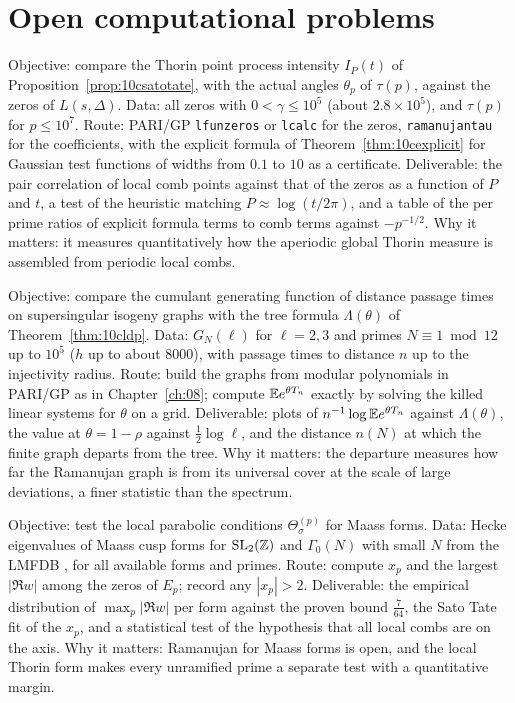 \section{Open computational problems}

\begin{compproblem}
Objective: compare the Thorin point process intensity $I_P(t)$ of Proposition~\ref{prop:10csatotate}, with the actual angles $\theta_p$ of $\tau(p)$, against the zeros of $L(s,\Delta)$. Data: all zeros with $0<\gamma\le10^5$ (about $2.8\times10^5$), and $\tau(p)$ for $p\le10^7$. Route: PARI/GP \texttt{lfunzeros} or \texttt{lcalc} for the zeros, \texttt{ramanujantau} for the coefficients, with the explicit formula of Theorem~\ref{thm:10cexplicit} for Gaussian test functions of widths from $0.1$ to $10$ as a certificate. Deliverable: the pair correlation of local comb points against that of the zeros as a function of $P$ and $t$, a test of the heuristic matching $P\approx\log(t/2\pi)$, and a table of the per prime ratios of explicit formula terms to comb terms against $-p^{-1/2}$. Why it matters: it measures quantitatively how the aperiodic global Thorin measure is assembled from periodic local combs.
\end{compproblem}

\begin{compproblem}
Objective: compare the cumulant generating function of distance passage times on supersingular isogeny graphs with the tree formula $\Lambda(\theta)$ of Theorem~\ref{thm:10cldp}. Data: $G_N(\ell)$ for $\ell=2,3$ and primes $N\equiv1\bmod12$ up to $10^5$ ($h$ up to about $8000$), with passage times to distance $n$ up to the injectivity radius. Route: build the graphs from modular polynomials in PARI/GP as in Chapter~\ref{ch:08}; compute $\mathbb{E} e^{\theta T_n}$ exactly by solving the killed linear systems for $\theta$ on a grid. Deliverable: plots of $n^{-1}\log\mathbb{E} e^{\theta T_n}$ against $\Lambda(\theta)$, the value at $\theta=1-\rho$ against $\frac12\log\ell$, and the distance $n(N)$ at which the finite graph departs from the tree. Why it matters: the departure measures how far the Ramanujan graph is from its universal cover at the scale of large deviations, a finer statistic than the spectrum.
\end{compproblem}

\begin{compproblem}
Objective: test the local parabolic conditions $\Theta^{(p)}_\sigma$ for Maass forms. Data: Hecke eigenvalues of Maass cusp forms for $\mathrm{SL}_2(\mathbb{Z})$ and $\Gamma_0(N)$ with small $N$ from the LMFDB \cite{lmfdb}, for all available forms and primes. Route: compute $x_p$ and the largest $|\Re w|$ among the zeros of $E_p$; record any $|x_p|>2$. Deliverable: the empirical distribution of $\max_p|\Re w|$ per form against the proven bound $\frac{7}{64}$, the Sato Tate fit of the $x_p$, and a statistical test of the hypothesis that all local combs are on the axis. Why it matters: Ramanujan for Maass forms is open, and the local Thorin form makes every unramified prime a separate test with a quantitative margin.
\end{compproblem}

